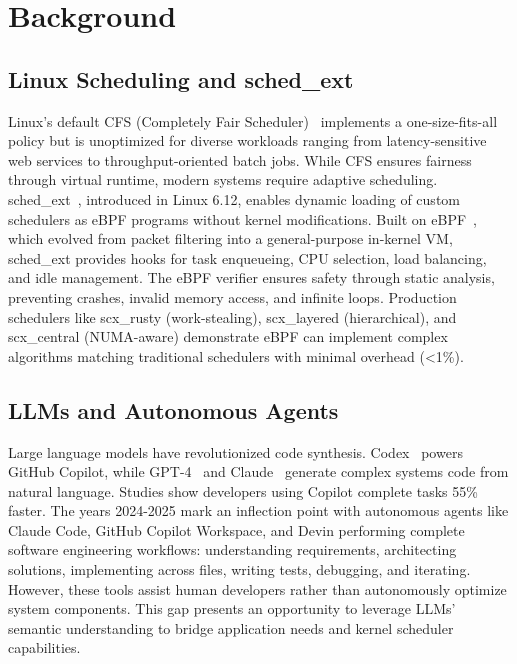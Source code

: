 \section{Background}
\label{sec:background}

\subsection{Linux Scheduling and sched\_ext}

Linux's default CFS (Completely Fair Scheduler)~\cite{wong2008cfs} implements a one-size-fits-all policy but is unoptimized for diverse workloads ranging from latency-sensitive web services to throughput-oriented batch jobs. While CFS ensures fairness through virtual runtime, modern systems require adaptive scheduling. sched\_ext~\cite{schedext2024}, introduced in Linux 6.12, enables dynamic loading of custom schedulers as eBPF programs without kernel modifications. Built on eBPF~\cite{mccanne1993bpf,gregg2019bpf}, which evolved from packet filtering into a general-purpose in-kernel VM, sched\_ext provides hooks for task enqueueing, CPU selection, load balancing, and idle management. The eBPF verifier ensures safety through static analysis, preventing crashes, invalid memory access, and infinite loops. Production schedulers like scx\_rusty (work-stealing), scx\_layered (hierarchical), and scx\_central (NUMA-aware) demonstrate eBPF can implement complex algorithms matching traditional schedulers with minimal overhead (<1\%).

\subsection{LLMs and Autonomous Agents}

Large language models have revolutionized code synthesis. Codex~\cite{chen2021codex} powers GitHub Copilot, while GPT-4~\cite{openai2023gpt4} and Claude~\cite{anthropic2024claude} generate complex systems code from natural language. Studies show developers using Copilot complete tasks 55\% faster. The years 2024-2025 mark an inflection point with autonomous agents like Claude Code, GitHub Copilot Workspace, and Devin performing complete software engineering workflows: understanding requirements, architecting solutions, implementing across files, writing tests, debugging, and iterating. However, these tools assist human developers rather than autonomously optimize system components. This gap presents an opportunity to leverage LLMs' semantic understanding to bridge application needs and kernel scheduler capabilities.

